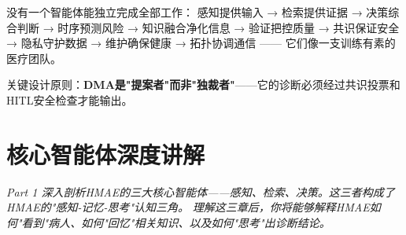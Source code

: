 \documentclass[11pt,a4paper]{ctexart}
\begin{document}
\begin{keybox}
没有一个智能体能独立完成全部工作：
感知提供输入 → 检索提供证据 → 决策综合判断 → 时序预测风险 →
知识融合净化信息 → 验证把控质量 → 共识保证安全 → 隐私守护数据 →
维护确保健康 → 拓扑协调通信 —— 它们像一支训练有素的医疗团队。

关键设计原则：\textbf{DMA是"提案者"而非"独裁者"}——它的诊断必须经过共识投票和HITL安全检查才能输出。
\end{keybox}

\newpage

\part{核心智能体深度讲解}\vspace{18pt}
\vspace{6pt}
\begin{center}
\small
\textit{Part 1 深入剖析HMAE的三大核心智能体——感知、检索、决策。这三者构成了HMAE的"感知-记忆-思考"认知三角。}
\textit{理解这三章后，你将能够解释HMAE如何"看到"病人、如何"回忆"相关知识、以及如何"思考"出诊断结论。}
\end{center}
\vspace{12pt}
\end{document}
